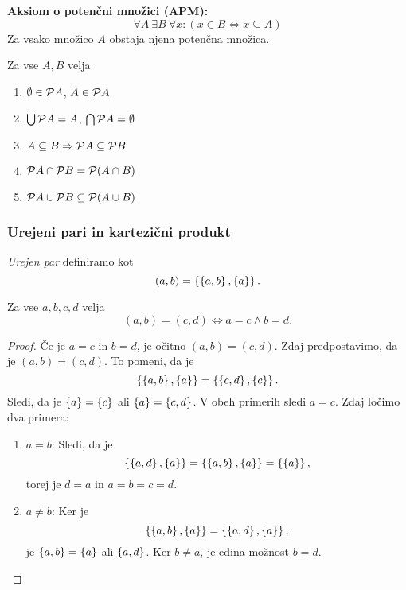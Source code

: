 \documentclass[12pt, a4paper]{article}
\renewcommand{\implies}{\Rightarrow}
\renewcommand{\iff}{\Leftrightarrow}
\begin{document}
\begin{okvir}
\textbf{Aksiom o potenčni množici (APM):}
\[
\forall A~\exists B~\forall x\colon(x\in B\iff x\subseteq A)
\]
Za vsako množico $A$ obstaja njena potenčna množica.
\end{okvir}

\begin{izrek}
Za vse $A,B$ velja

\begin{enumerate}
\item $\emptyset\in\mathcal{P} A$, $A\in\mathcal{P} A$
\item $\bigcup\mathcal{P} A=A$, $\bigcap\mathcal{P} A=\emptyset$
\item $A\subseteq B\implies \pot A\subseteq\pot B$
\item $\mathcal{P} A\cap\mathcal{P} B=\mathcal{P} (A\cap B)$
\item $\mathcal{P} A\cup\mathcal{P} B\subseteq \mathcal{P} (A\cup B)$
\end{enumerate}
\end{izrek}

\obvs

\newpage

\subsubsection{Urejeni pari in kartezični produkt}

\begin{okvir}
\begin{definicija}
\emph{Urejen par} definiramo kot
\[
(a,b)=\left\{\left\{a,b\right\},\left\{a\right\}\right\}.
\]
\end{definicija}
\end{okvir}

\begin{izrek}
Za vse $a,b,c,d$ velja
\[
(a,b)=(c,d)\iff a=c\land b=d.
\]
\end{izrek}

\begin{proof}
Če je $a=c$ in $b=d$, je očitno $(a,b)=(c,d)$. Zdaj predpostavimo, da je $(a,b)=(c,d)$. To pomeni, da je
\[
\left\{\left\{a,b\right\},\left\{a\right\}\right\}=\left\{\left\{c,d\right\},\left\{c\right\}\right\}.
\]
Sledi, da je $\left\{a\right\}=\left\{c\right\}$ ali $\left\{a\right\}=\left\{c,d\right\}$. V obeh primerih sledi $a=c$. Zdaj ločimo dva primera:

\begin{enumerate}
\item $a=b$: Sledi, da je
\[
\left\{\left\{a,d\right\},\left\{a\right\}\right\}=\left\{\left\{a,b\right\},\left\{a\right\}\right\}=\left\{\left\{a\right\}\right\},
\]
torej je $d=a$ in $a=b=c=d$.
\item $a\ne b$: Ker je
\[
\left\{\left\{a,b\right\},\left\{a\right\}\right\}=\left\{\left\{a,d\right\},\left\{a\right\}\right\},
\]
je $\left\{a,b\right\}=\left\{a\right\}$ ali $\left\{a,d\right\}$. Ker $b\ne a$, je edina možnost $b=d$.\qedhere
\end{enumerate}
\end{proof}
\end{document}
